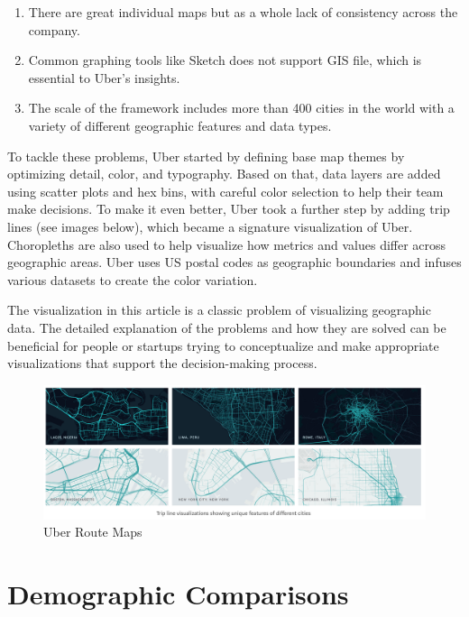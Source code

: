 \documentclass[]{book}
\providecommand{\tightlist}{%
  \setlength{\itemsep}{0pt}\setlength{\parskip}{0pt}}
\theoremstyle{definition}
\theoremstyle{definition}
\theoremstyle{definition}
\theoremstyle{remark}
\begin{document}
\begin{enumerate}
\def\labelenumi{\arabic{enumi}.}
\tightlist
\item
  There are great individual maps but as a whole lack of consistency
  across the company.
\item
  Common graphing tools like Sketch does not support GIS file, which is
  essential to Uber's insights.
\item
  The scale of the framework includes more than 400 cities in the world
  with a variety of different geographic features and data types.
\end{enumerate}

To tackle these problems, Uber started by defining base map themes by
optimizing detail, color, and typography. Based on that, data layers are
added using scatter plots and hex bins, with careful color selection to
help their team make decisions. To make it even better, Uber took a
further step by adding trip lines (see images below), which became a
signature visualization of Uber. Choropleths are also used to help
visualize how metrics and values differ across geographic areas. Uber
uses US postal codes as geographic boundaries and infuses various
datasets to create the color variation.

The visualization in this article is a classic problem of visualizing
geographic data. The detailed explanation of the problems and how they
are solved can be beneficial for people or startups trying to
conceptualize and make appropriate visualizations that support the
decision-making process.

\begin{figure}
\centering
\includegraphics{images/uber_mapping.png}
\caption{Uber Route Maps}
\end{figure}

\section{Demographic Comparisons}\label{demographic-comparisons}
\end{document}
